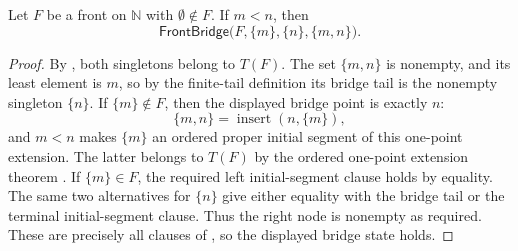 \begin{lemma}
Let $F$ be a front on $\mathbb N$ with $\emptyset\notin F$.  If
$m<n$, then
\[
  \mathsf{FrontBridge}\bigl(F,\{m\},\{n\},\{m,n\}\bigr).
\]
\end{lemma}
\begin{proof}
By , both singletons belong to $T(F)$.
The set $\{m,n\}$ is nonempty, and its least element is $m$, so by the
finite-tail definition  its bridge tail is the
nonempty singleton $\{n\}$.  If $\{m\}\notin F$,
then the displayed bridge point is exactly $n$:
\[
 \{m,n\}=\operatorname{insert}(n,\{m\}),
\]
and $m<n$ makes $\{m\}$ an ordered proper initial segment of this
one-point extension.  The latter belongs to $T(F)$ by the ordered
one-point extension theorem .  If
$\{m\}\in F$, the required left initial-segment clause holds by equality.
The same two alternatives for $\{n\}$ give either equality with the
bridge tail or the terminal initial-segment clause.  Thus the right node
is nonempty as required.  These are precisely all clauses of
, so the displayed bridge state holds.
\end{proof}
